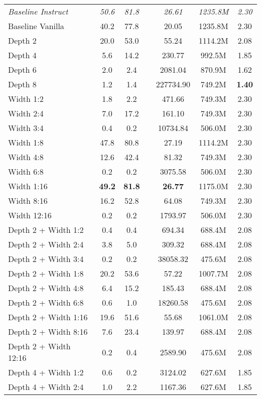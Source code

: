 {\begin{longtable}{lcccccc}
\textit{Baseline Instruct} & \textit{50.6} & \textit{81.8} & & \textit{26.61} & \textit{1235.8M} & \textit{2.30} \\
Baseline Vanilla & 40.2 & 77.8 & & 20.05 & 1235.8M & 2.30 \\
Depth 2 & 20.0 & 53.0 & & 55.24 & 1114.2M & 2.08 \\
Depth 4 & 5.6 & 14.2 & & 230.77 & 992.5M & 1.85 \\
Depth 6 & 2.0 & 2.4 & & 2081.04 & 870.9M & 1.62 \\
Depth 8 & 1.2 & 1.4 & & 227734.90 & 749.2M & \textbf{1.40} \\
Width 1:2 & 1.8 & 2.2 & & 471.66 & 749.3M & 2.30 \\
Width 2:4 & 7.0 & 17.2 & & 161.10 & 749.3M & 2.30 \\
Width 3:4 & 0.4 & 0.2 & & 10734.84 & 506.0M & 2.30 \\
Width 1:8 & 47.8 & 80.8 & & 27.19 & 1114.2M & 2.30 \\
Width 4:8 & 12.6 & 42.4 & & 81.32 & 749.3M & 2.30 \\
Width 6:8 & 0.2 & 0.2 & & 3075.58 & 506.0M & 2.30 \\
Width 1:16 & \textbf{49.2} & \textbf{81.8} & & \textbf{26.77} & 1175.0M & 2.30 \\
Width 8:16 & 16.2 & 52.8 & & 64.08 & 749.3M & 2.30 \\
Width 12:16 & 0.2 & 0.2 & & 1793.97 & 506.0M & 2.30 \\
Depth 2 + Width 1:2 & 0.4 & 0.4 & & 694.34 & 688.4M & 2.08 \\
Depth 2 + Width 2:4 & 3.8 & 5.0 & & 309.32 & 688.4M & 2.08 \\
Depth 2 + Width 3:4 & 0.2 & 0.2 & & 38058.32 & 475.6M & 2.08 \\
Depth 2 + Width 1:8 & 20.2 & 53.6 & & 57.22 & 1007.7M & 2.08 \\
Depth 2 + Width 4:8 & 6.4 & 15.2 & & 185.43 & 688.4M & 2.08 \\
Depth 2 + Width 6:8 & 0.6 & 1.0 & & 18260.58 & 475.6M & 2.08 \\
Depth 2 + Width 1:16 & 19.6 & 51.6 & & 55.68 & 1061.0M & 2.08 \\
Depth 2 + Width 8:16 & 7.6 & 23.4 & & 139.97 & 688.4M & 2.08 \\
Depth 2 + Width 12:16 & 0.2 & 0.4 & & 2589.90 & 475.6M & 2.08 \\
Depth 4 + Width 1:2 & 0.6 & 0.2 & & 3124.02 & 627.6M & 1.85 \\
Depth 4 + Width 2:4 & 1.0 & 2.2 & & 1167.36 & 627.6M & 1.85 \\

\end{longtable}}
